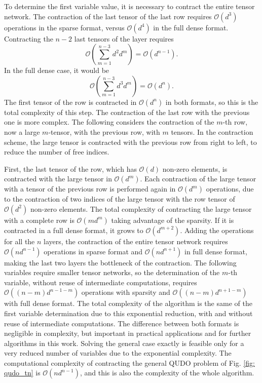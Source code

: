 \documentclass[%
 reprint,
 amsmath,amssymb,
 aps,
 pra,showkeys,
]{revtex4-2}
\begin{document}
To determine the first variable value, it is necessary to contract the entire tensor network. The contraction of the last tensor of the last row requires $\mathcal{O}(d^3)$ operations in the sparse format, versus $\mathcal{O}(d^4)$ in the full dense format. Contracting the $n-2$ last tensors of the layer requires
\begin{equation}
    \mathcal{O}\left(\sum_{m=1}^{n-3} d^2 d^m\right)=\mathcal{O}\left(d^{n-1}\right).
\end{equation}
In the full dense case, it would be
\begin{equation}
    \mathcal{O}\left(\sum_{m=1}^{n-3} d^3 d^m\right)=\mathcal{O}\left(d^{n}\right).
\end{equation}
The first tensor of the row is contracted in $\mathcal{O}(d^n)$ in both formats, so this is the total complexity of this step. The contraction of the last row with the previous one is more complex. The following considers the contraction of the $m$-th row, now a large $m$-tensor, with the previous row, with $m$ tensors. In the contraction scheme, the large tensor is contracted with the previous row from right to left, to reduce the number of free indices.

First, the last tensor of the row, which has $\mathcal{O}(d)$ non-zero elements, is contracted with the large tensor in $\mathcal{O}(d^m)$. Each contraction of the large tensor with a tensor of the previous row is performed again in $\mathcal{O}(d^m)$ operations, due to the contraction of two indices of the large tensor with the row tensor of $\mathcal{O}(d^2)$ non-zero elements. The total complexity of contracting the large tensor with a complete row is $\mathcal{O}(md^m)$ taking advantage of the sparsity. If it is contracted in a full dense format, it grows to $\mathcal{O}(d^{m+2})$. Adding the operations for all the $n$ layers, the contraction of the entire tensor network requires $\mathcal{O}(nd^{n-1})$ operations in sparse format and $\mathcal{O}(nd^{n+1})$ in full dense format, making the last two layers the bottleneck of the contraction. The following variables require smaller tensor networks, so the determination of the $m$-th variable, without reuse of intermediate computations, requires $\mathcal{O}((n-m)d^{n-1-m})$ operations with sparsity and $\mathcal{O}((n-m)d^{n+1-m})$ with full dense format. The total complexity of the algorithm is the same of the first variable determination due to this exponential reduction, with and without reuse of intermediate computations. The difference between both formats is negligible in complexity, but important in practical applications and for further algorithms in this work. Solving the general case exactly is feasible only for a very reduced number of variables due to the exponential complexity. The computational complexity of contracting the general QUDO problem of Fig. \ref{fig: qudo_tn} is $\mathcal{O}(nd^{n-1})$, and this is also the complexity of the whole algorithm.
\end{document}

